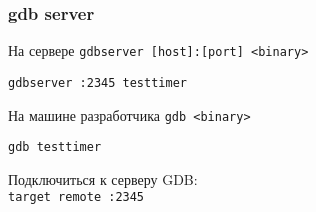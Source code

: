 \begin{frame}[fragile]
  \frametitle{gdb server}

    \begin{block}{На сервере}
    {\tt gdbserver [host]:[port] <binary>}

        \begin{verbatim}
gdbserver :2345 testtimer
\end{verbatim}
    \end{block}


    \begin{block}{На машине разработчика}
      {\tt gdb <binary>}
        \begin{verbatim}
gdb testtimer
\end{verbatim}

    Подключиться к серверу GDB:\\
    {\tt target remote :2345}

    \end{block}
\end{frame}

